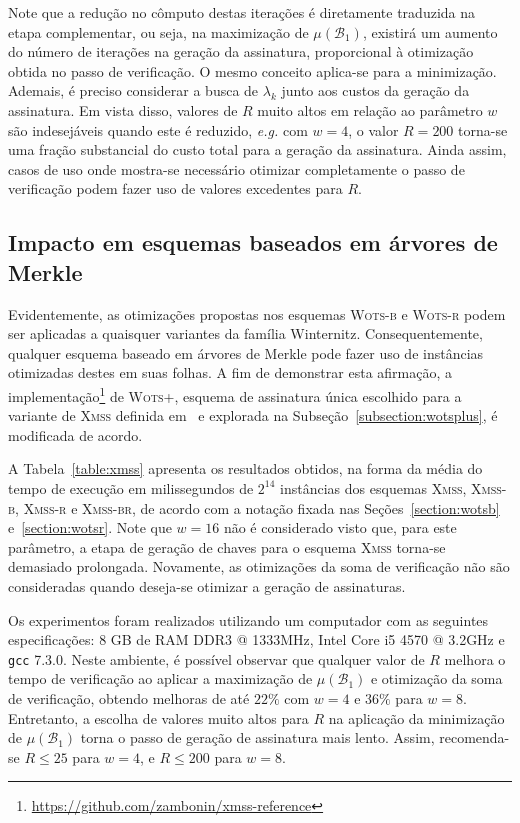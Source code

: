 \documentclass{ufsctex/ufsctex}
\newcommand{\wotsplus}{\textsc{Wots+}}
\newcommand{\wotsb}{\textsc{Wots-b}}
\newcommand{\wotsr}{\textsc{Wots-r}}
\newcommand{\xmss}{\textsc{Xmss}}
\newcommand{\xmssb}{\textsc{Xmss-b}}
\newcommand{\xmssr}{\textsc{Xmss-r}}
\newcommand{\xmssbr}{\textsc{Xmss-br}}
\begin{document}
Note que a redução no cômputo destas iterações é diretamente traduzida na etapa
complementar, ou seja, na maximização de $\mu(\mathcal{B}_1)$, existirá um
aumento do número de iterações na geração da assinatura, proporcional à
otimização obtida no passo de verificação. O mesmo conceito aplica-se para a
minimização. Ademais, é preciso considerar a busca de $\lambda_k$ junto aos
custos da geração da assinatura. Em vista disso, valores de $R$ muito altos em
relação ao parâmetro $w$ são indesejáveis quando este é reduzido, \emph{e.g.}
com $w = 4$, o valor $R = 200$ torna-se uma fração substancial do custo total
para a geração da assinatura. Ainda assim, casos de uso onde mostra-se
necessário otimizar completamente o passo de verificação podem fazer uso de
valores excedentes para $R$.

\subsection{Impacto em esquemas baseados
  em árvores de Merkle}\label{subsection:impact}

Evidentemente, as otimizações propostas nos esquemas \wotsb{} e \wotsr{} podem
ser aplicadas a quaisquer variantes da família Winternitz. Consequentemente,
qualquer esquema baseado em árvores de Merkle pode fazer uso de instâncias
otimizadas destes em suas folhas. A fim de demonstrar esta afirmação, a
implementação\footnote{\url{https://github.com/zambonin/xmss-reference}} de
\wotsplus{}, esquema de assinatura única escolhido para a variante de \xmss{}
definida em~\cite[Seção 3.1]{Huelsing:report:2018:may} e explorada na
Subseção~\ref{subsection:wotsplus}, é modificada de acordo.

A Tabela~\ref{table:xmss} apresenta os resultados obtidos, na forma da média do
tempo de execução em milissegundos de $2^{14}$ instâncias dos esquemas \xmss{},
\xmssb{}, \xmssr{} e \xmssbr{}, de acordo com a notação fixada nas
Seções~\ref{section:wotsb} e~\ref{section:wotsr}. Note que $w = 16$ não é
considerado visto que, para este parâmetro, a etapa de geração de chaves para o
esquema \xmss{} torna-se demasiado prolongada. Novamente, as otimizações da
soma de verificação não são consideradas quando deseja-se otimizar a geração de
assinaturas.

Os experimentos foram realizados utilizando um computador com as seguintes
especificações: 8 GB de RAM DDR3 @ 1333MHz, Intel Core i5 4570 @ 3.2GHz e
\texttt{gcc} 7.3.0. Neste ambiente, é possível observar que qualquer valor de
$R$ melhora o tempo de verificação ao aplicar a maximização de
$\mu(\mathcal{B}_1)$ e otimização da soma de verificação, obtendo melhoras de
até $22\%$ com $w = 4$ e $36\%$ para $w = 8$. Entretanto, a escolha de valores
muito altos para $R$ na aplicação da minimização de $\mu(\mathcal{B}_1)$ torna
o passo de geração de assinatura mais lento. Assim, recomenda-se $R \leq 25$
para $w = 4$, e $R \leq 200$ para $w = 8$.
\end{document}
